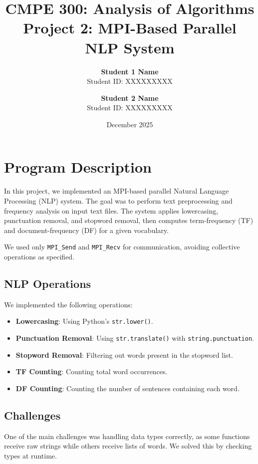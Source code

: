 \documentclass[12pt,a4paper]{article}
\title{
    \textbf{CMPE 300: Analysis of Algorithms} \\
    \vspace{0.5cm}
    \Large Project 2: MPI-Based Parallel NLP System \\
    \vspace{1cm}
}
\author{
    \textbf{Student 1 Name} \\
    Student ID: XXXXXXXXX \\
    \and
    \textbf{Student 2 Name} \\
    Student ID: XXXXXXXXX
}
\date{December 2025}
\begin{document}
\maketitle
\thispagestyle{empty}
\newpage

\tableofcontents
\newpage

\section{Program Description}

In this project, we implemented an MPI-based parallel Natural Language Processing (NLP) system. The goal was to perform text preprocessing and frequency analysis on input text files. The system applies lowercasing, punctuation removal, and stopword removal, then computes term-frequency (TF) and document-frequency (DF) for a given vocabulary.

We used only \texttt{MPI\_Send} and \texttt{MPI\_Recv} for communication, avoiding collective operations as specified.

\subsection{NLP Operations}

We implemented the following operations:
\begin{itemize}
    \item \textbf{Lowercasing}: Using Python's \texttt{str.lower()}.
    \item \textbf{Punctuation Removal}: Using \texttt{str.translate()} with \texttt{string.punctuation}.
    \item \textbf{Stopword Removal}: Filtering out words present in the stopword list.
    \item \textbf{TF Counting}: Counting total word occurrences.
    \item \textbf{DF Counting}: Counting the number of sentences containing each word.
\end{itemize}

\subsection{Challenges}

One of the main challenges was handling data types correctly, as some functions receive raw strings while others receive lists of words. We solved this by checking types at runtime.
\end{document}
